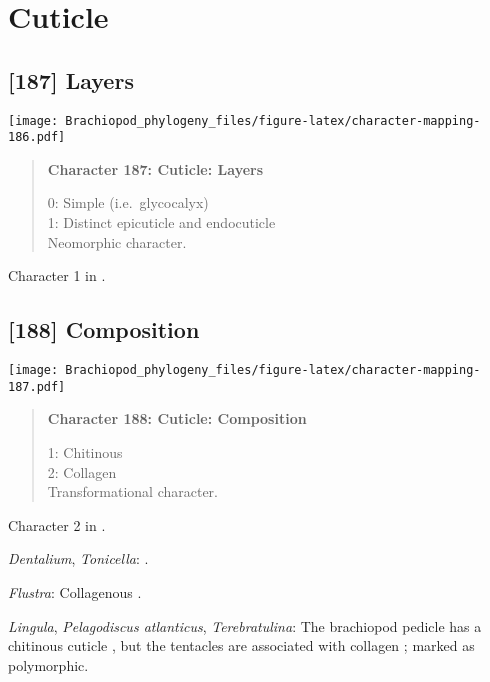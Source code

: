 \documentclass[openany]{book}
\theoremstyle{definition}
\theoremstyle{definition}
\theoremstyle{definition}
\theoremstyle{remark}
\begin{document}
\section{Cuticle}\label{cuticle}

\subsection*{{[}187{]} Layers}\label{layers}

\texttt{[image: Brachiopod\_phylogeny\_files/figure-latex/character-mapping-186.pdf]}

\begin{quote}
\textbf{Character 187: Cuticle: Layers}

0: Simple (i.e.~glycocalyx)\\
1: Distinct epicuticle and endocuticle\\
Neomorphic character.
\end{quote}

Character 1 in \citet{Haszprunar1996}.

\subsection*{{[}188{]} Composition}\label{composition}

\texttt{[image: Brachiopod\_phylogeny\_files/figure-latex/character-mapping-187.pdf]}

\begin{quote}
\textbf{Character 188: Cuticle: Composition}

1: Chitinous\\
2: Collagen\\
Transformational character.
\end{quote}

Character 2 in \citet{Haszprunar2008}.

\hypertarget{Dentalium-coding-188}{}
\emph{Dentalium}, \emph{Tonicella}: \citet{Haszprunar2008}.

\hypertarget{Flustra-coding-188}{}
\emph{Flustra}: Collagenous \citep{Schopf1967}.

\hypertarget{Lingula-coding-188}{}
\emph{Lingula}, \emph{Pelagodiscus atlanticus}, \emph{Terebratulina}:
The brachiopod pedicle has a chitinous cuticle
\citep{Williams1997Introduction, MacKay1978}, but the tentacles are
associated with collagen \citep{Williams1997Introduction}; marked as
polymorphic.
\end{document}
